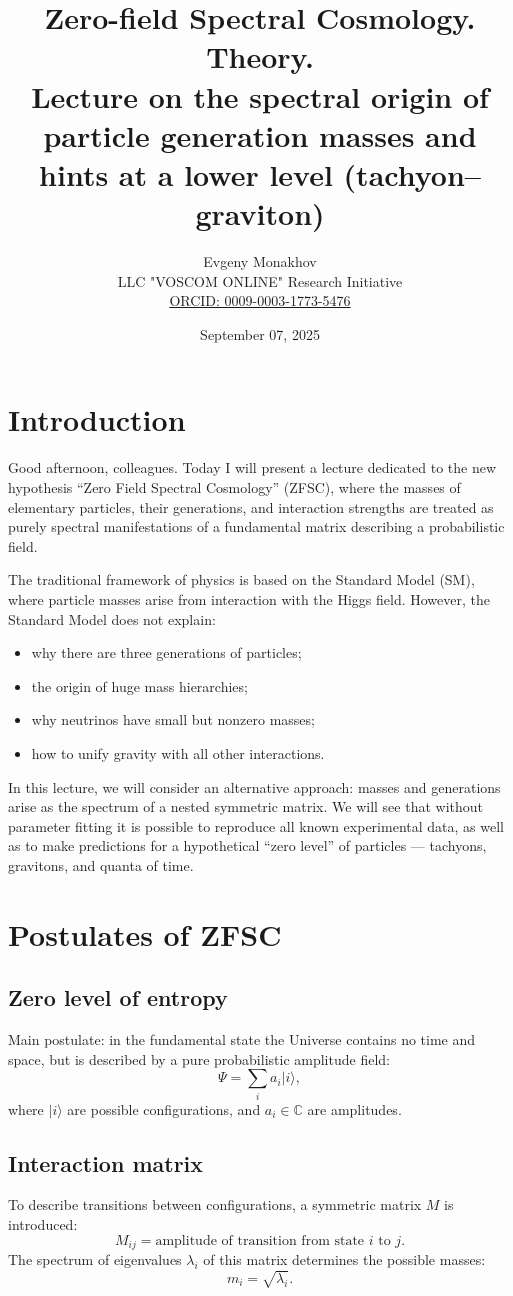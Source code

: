 \documentclass[12pt,a4paper]{article}
\title{Zero-field Spectral Cosmology. Theory.\\
Lecture on the spectral origin of particle generation masses and hints at a lower level (tachyon--graviton)}
\author{Evgeny Monakhov \\ LLC "VOSCOM ONLINE" Research Initiative \\ \href{https://orcid.org/0009-0003-1773-5476}{ORCID: 0009-0003-1773-5476}}
\date{September 07, 2025}
\begin{document}
\maketitle

\section*{Introduction}
Good afternoon, colleagues. Today I will present a lecture dedicated to the new hypothesis ``Zero Field Spectral Cosmology'' (ZFSC), where the masses of elementary particles, their generations, and interaction strengths are treated as purely spectral manifestations of a fundamental matrix describing a probabilistic field.

The traditional framework of physics is based on the Standard Model (SM), where particle masses arise from interaction with the Higgs field. However, the Standard Model does not explain:
\begin{itemize}
  \item why there are three generations of particles;
  \item the origin of huge mass hierarchies;
  \item why neutrinos have small but nonzero masses;
  \item how to unify gravity with all other interactions.
\end{itemize}

In this lecture, we will consider an alternative approach: 
masses and generations arise as the spectrum of a nested symmetric matrix. 
We will see that without parameter fitting it is possible to reproduce all known experimental data, as well as to make predictions for a hypothetical ``zero level'' of particles --- tachyons, gravitons, and quanta of time.

\section{Postulates of ZFSC}
\subsection{Zero level of entropy}
Main postulate: in the fundamental state the Universe contains no time and space, but is described by a pure probabilistic amplitude field:
\[
\Psi = \sum_i a_i | i \rangle,
\]
where $|i\rangle$ are possible configurations, and $a_i \in \mathbb{C}$ are amplitudes.

\subsection{Interaction matrix}
To describe transitions between configurations, a symmetric matrix $M$ is introduced:
\[
M_{ij} = \text{amplitude of transition from state $i$ to $j$}.
\]
The spectrum of eigenvalues $\lambda_i$ of this matrix determines the possible masses:
\[
m_i = \sqrt{\lambda_i}.
\]
\end{document}
